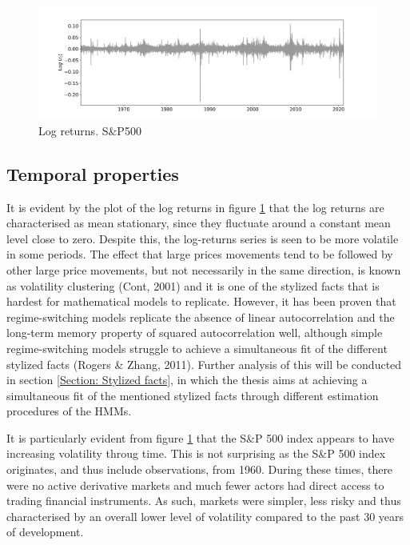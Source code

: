 \begin{figure}[H] 
    \centering
    \includegraphics[width=1\textwidth]{analysis/data_description/images/SP500_log_returns.png}
    \caption{Log returns. S\&P500}
    \label{fig: log_returns_all_indices}
\end{figure}

\label{subsection: distributional properties}

\subsection{Temporal properties}
\label{subsection: temporal properties}
It is evident by the plot of the log returns in figure \ref{fig: log_returns_all_indices} that the log returns are characterised as mean stationary, since they fluctuate around a constant mean level close to zero. Despite this, the log-returns series is seen to be more volatile in some periods. The effect that large prices movements tend to be followed by other large price movements, but not necessarily in the same direction, is known as volatility clustering (Cont, 2001) and it is one of the stylized facts that is hardest for mathematical models to replicate. However, it has been proven that regime-switching models replicate the absence of linear autocorrelation and the long-term memory property of squared autocorrelation well, although simple regime-switching models struggle to achieve a simultaneous fit of the
different stylized facts (Rogers \& Zhang, 2011). Further analysis of this will be conducted in section \ref{Section: Stylized facts}, in which the thesis aims at achieving a simultaneous fit of the mentioned stylized facts through different estimation procedures of the HMMs.

It is particularly evident from figure \ref{fig: log_returns_all_indices} that the S\&P 500 index appears to have increasing volatility throug time. This is not surprising as the S\&P 500 index originates, and thus include observations, from 1960. During these times, there were no active derivative markets and much fewer actors had direct access to trading financial instruments. As such, markets were simpler, less risky and thus characterised by an overall lower level of volatility compared to the past 30 years of development.


